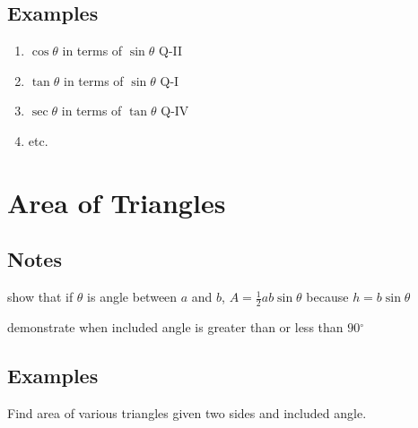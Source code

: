 \documentclass{exam}
\newcommand{\dg}{\ensuremath{^\circ}}
\begin{document}
  \subsection{Examples}

  \begin{enumerate}
    \item $\cos \theta$ in terms of $\sin \theta$ Q-II
    \item $\tan \theta$ in terms of $\sin \theta$ Q-I
    \item $\sec \theta$ in terms of $\tan \theta$ Q-IV
    \item etc.
  \end{enumerate}

  \section{Area of Triangles}
  \subsection{Notes}

  \begin{itemize*}
    \item show that if $\theta$ is angle between $a$ and $b$, $A = \frac{1}{2} ab \sin \theta$ because $h = b \sin
      \theta$
    \item demonstrate when included angle is greater than or less than $90 \dg$
  \end{itemize*}

  \subsection{Examples}

  Find area of various triangles given two sides and included angle.
\end{document}

